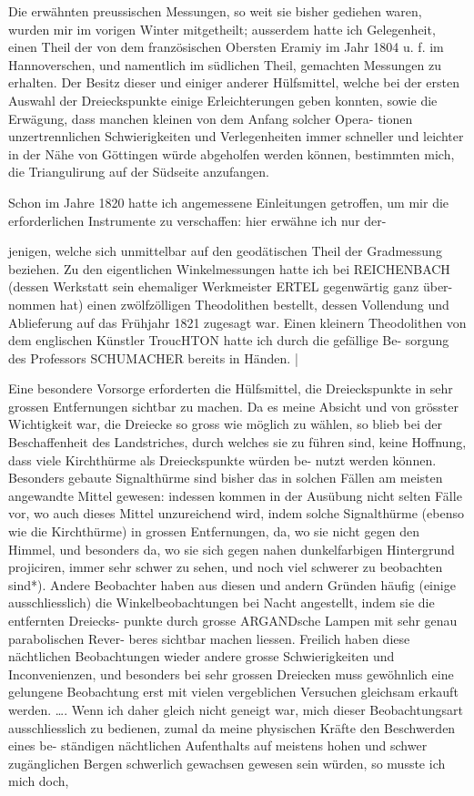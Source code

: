 \documentclass[12pt,a4paper]{article}
\theoremstyle{plain}
\theoremstyle{definition}
\theoremstyle{remark}
\begin{document}
\noindent
Die erwähnten preussischen Messungen, so weit sie bisher gediehen waren,
wurden mir im vorigen Winter mitgetheilt; ausserdem hatte ich Gelegenheit,
einen Theil der von dem französischen Obersten Eramiy im Jahr 1804 u. f.
im Hannoverschen, und namentlich im südlichen Theil, gemachten Messungen
zu erhalten. Der Besitz dieser und einiger anderer Hülfsmittel, welche bei
der ersten Auswahl der Dreieckspunkte einige Erleichterungen geben konnten,
sowie die Erwägung, dass manchen kleinen von dem Anfang solcher Opera-
tionen unzertrennlichen Schwierigkeiten und Verlegenheiten immer schneller
und leichter in der Nähe von Göttingen würde abgeholfen werden können,
bestimmten mich, die Triangulirung auf der Südseite anzufangen.

\noindent
Schon im Jahre 1820 hatte ich angemessene Einleitungen getroffen, um
mir die erforderlichen Instrumente zu verschaffen: hier erwähne ich nur der-

\noindent

\noindent

\noindent
jenigen, welche sich unmittelbar auf den geodätischen Theil der Gradmessung
beziehen. Zu den eigentlichen Winkelmessungen hatte ich bei REICHENBACH
(dessen Werkstatt sein ehemaliger Werkmeister ERTEL gegenwärtig ganz über-
nommen hat) einen zwölfzölligen Theodolithen bestellt, dessen Vollendung und
Ablieferung auf das Frühjahr 1821 zugesagt war. Einen kleinern Theodolithen
von dem englischen Künstler TroucHTON hatte ich durch die gefällige Be-
sorgung des Professors SCHUMACHER bereits in Händen. |

\noindent
Eine besondere Vorsorge erforderten die Hülfsmittel, die Dreieckspunkte
in sehr grossen Entfernungen sichtbar zu machen. Da es meine Absicht und
von grösster Wichtigkeit war, die Dreiecke so gross wie möglich zu wählen,
so blieb bei der Beschaffenheit des Landstriches, durch welches sie zu führen
sind, keine Hoffnung, dass viele Kirchthürme als Dreieckspunkte würden be-
nutzt werden können. Besonders gebaute Signalthürme sind bisher das in
solchen Fällen am meisten angewandte Mittel gewesen: indessen kommen in
der Ausübung nicht selten Fälle vor, wo auch dieses Mittel unzureichend
wird, indem solche Signalthürme (ebenso wie die Kirchthürme) in grossen
Entfernungen, da, wo sie nicht gegen den Himmel, und besonders da, wo sie
sich gegen nahen dunkelfarbigen Hintergrund projiciren, immer sehr schwer
zu sehen, und noch viel schwerer zu beobachten sind*). Andere Beobachter
haben aus diesen und andern Gründen häufig (einige ausschliesslich) die
Winkelbeobachtungen bei Nacht angestellt, indem sie die entfernten Dreiecks-
punkte durch grosse ARGANDsche Lampen mit sehr genau parabolischen Rever-
beres sichtbar machen liessen. Freilich haben diese nächtlichen Beobachtungen
wieder andere grosse Schwierigkeiten und Inconvenienzen, und besonders bei
sehr grossen Dreiecken muss gewöhnlich eine gelungene Beobachtung erst mit
vielen vergeblichen Versuchen gleichsam erkauft werden. \ldots. Wenn ich
daher gleich nicht geneigt war, mich dieser Beobachtungsart ausschliesslich
zu bedienen, zumal da meine physischen Kräfte den Beschwerden eines be-
ständigen nächtlichen Aufenthalts auf meistens hohen und schwer zugänglichen
Bergen schwerlich gewachsen gewesen sein würden, so musste ich mich doch,
\end{document}

